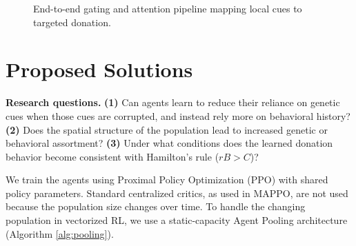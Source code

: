 \documentclass{article}
\begin{document}
\begin{figure}[!htbp]
\centering
{}
\caption{End-to-end gating and attention pipeline mapping local cues to targeted donation.}
\label{fig:pipeline}
\end{figure}

\section{Proposed Solutions}

\textbf{Research questions.} \textbf{(1)} Can agents learn to reduce their reliance on genetic cues when those cues are corrupted, and instead rely more on behavioral history? \textbf{(2)} Does the spatial structure of the population lead to increased genetic or behavioral assortment? \textbf{(3)} Under what conditions does the learned donation behavior become consistent with Hamilton's rule ($rB > C$)?

We train the agents using Proximal Policy Optimization (PPO) with shared policy parameters. Standard centralized critics, as used in MAPPO, are not used because the population size changes over time. To handle the changing population in vectorized RL, we use a static-capacity Agent Pooling architecture (Algorithm \ref{alg:pooling}).
\end{document}
